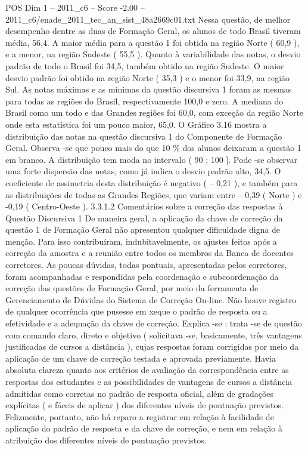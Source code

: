 \begin{textsample}{POS Dim 1 – 2011\_c6 – Score -2.00 – 2011\_c6/enade\_2011\_tec\_an\_sist\_48a2669c01.txt}
Nessa questão, de melhor desempenho dentre as duas de Formação Geral, os alunos de todo Brasil tiveram média, 56,4.
A maior média para a questão 1 foi obtida na região Norte ( 60,9 ), e a menor, na região Sudeste ( 55,5 ).
Quanto à variabilidade das notas, o desvio padrão de todo o Brasil foi 34,5, também obtido na região Sudeste.
O maior desvio padrão foi obtido na região Norte ( 35,3 ) e o menor foi 33,9, na região Sul.
As notas máximas e as mínimas da questão discursiva 1 foram as mesmas para todas as regiões do Brasil, respectivamente 100,0 e zero.
A mediana do Brasil como um todo e das Grandes regiões foi 60,0, com exceção da região Norte onde esta estatística foi um pouco maior, 65,0.
O Gráfico 3.16 mostra a distribuição das notas na questão discursiva 1 do Componente de Formação Geral.
Observa -se que pouco mais do que 10 \% dos alunos deixaram a questão 1 em branco.
A distribuição tem moda no intervalo ( 90 ; 100 ].
Pode -se observar uma forte dispersão das notas, como já indica o desvio padrão alto, 34,5.
O coeficiente de assimetria desta distribuição é negativo ( – 0,21 ), e também para as distribuições de todas as Grandes Regiões, que variam entre – 0,39 ( Norte ) e -0,19 ( Centro-Oeste ). 3.3.1.2 Comentários sobre a correção das respostas à Questão Discursiva 1 De maneira geral, a aplicação da chave de correção da questão 1 de Formação Geral não apresentou qualquer dificuldade digna de menção.
Para isso contribuíram, indubitavelmente, os ajustes feitos após a correção da amostra e a reunião entre todos os membros da Banca de docentes corretores.
As poucas dúvidas, todas pontuais, apresentadas pelos corretores, foram acompanhadas e respondidas pela coordenação e subcoordenação da correção das questões de Formação Geral, por meio da ferramenta de Gerenciamento de Dúvidas do Sistema de Correção On-line.
Não houve registro de qualquer ocorrência que pusesse em xeque o padrão de resposta ou a efetividade e a adequação da chave de correção.
Explica -se : trata -se de questão com comando claro, direto e objetivo ( solicitava -se, basicamente, três vantagens justificadas de cursos a distância ), cujas respostas foram corrigidas por meio da aplicação de um chave de correção testada e aprovada previamente.
Havia absoluta clareza quanto aos critérios de avaliação da correspondência entre as respostas dos estudantes e as possibilidades de vantagens de cursos a distância admitidas como corretas no padrão de resposta oficial, além de gradações explícitas ( e fáceis de aplicar ) dos diferentes níveis de pontuação previstos.
Felizmente, portanto, não há reparo a registrar em relação à facilidade de aplicação do padrão de resposta e da chave de correção, e nem em relação à atribuição dos diferentes níveis de pontuação previstos.

\end{textsample}

